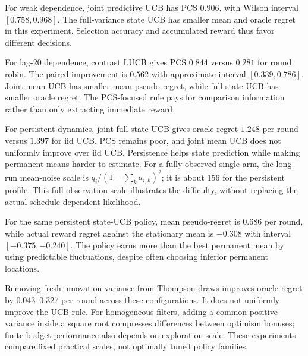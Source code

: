 For weak dependence, joint predictive UCB has PCS $0.906$, with Wilson interval $[0.758,0.968]$. The full-variance state UCB has smaller mean and oracle regret in this experiment. Selection accuracy and accumulated reward thus favor different decisions.

For lag-20 dependence, contrast LUCB gives PCS $0.844$ versus $0.281$ for round robin. The paired improvement is $0.562$ with approximate interval $[0.339,0.786]$. Joint mean UCB has smaller mean pseudo-regret, while full-state UCB has smaller oracle regret. The PCS-focused rule pays for comparison information rather than only extracting immediate reward.

For persistent dynamics, joint full-state UCB gives oracle regret $1.248$ per round versus $1.397$ for iid UCB. PCS remains poor, and joint mean UCB does not uniformly improve over iid UCB. Persistence helps state prediction while making permanent means harder to estimate. For a fully observed single arm, the long-run mean-noise scale is $q_i/(1-\sum_k a_{i,k})^2$; it is about 156 for the persistent profile. This full-observation scale illustrates the difficulty, without replacing the actual schedule-dependent likelihood.

For the same persistent state-UCB policy, mean pseudo-regret is $0.686$ per round, while actual reward regret against the stationary mean is $-0.308$ with interval $[-0.375,-0.240]$. The policy earns more than the best permanent mean by using predictable fluctuations, despite often choosing inferior permanent locations.

Removing fresh-innovation variance from Thompson draws improves oracle regret by 0.043--0.327 per round across these configurations. It does not uniformly improve the UCB rule. For homogeneous filters, adding a common positive variance inside a square root compresses differences between optimism bonuses; finite-budget performance also depends on exploration scale. These experiments compare fixed practical scales, not optimally tuned policy families.
